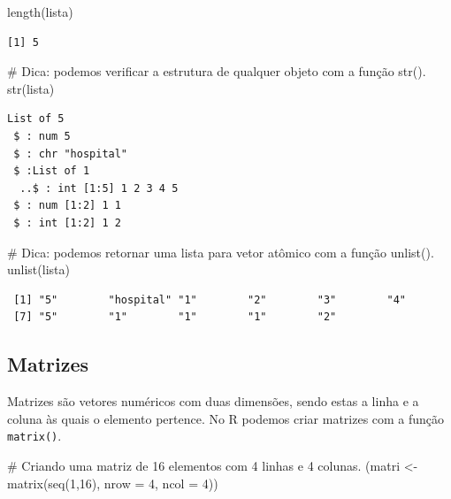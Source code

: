 \documentclass[
  letterpaper,
  DIV=11,
  numbers=noendperiod]{scrreprt}
\newenvironment{Shaded}{\begin{snugshade}}{\end{snugshade}}
\newcommand{\AttributeTok}[1]{\textcolor[rgb]{0.40,0.45,0.13}{#1}}
\newcommand{\CommentTok}[1]{\textcolor[rgb]{0.37,0.37,0.37}{#1}}
\newcommand{\DecValTok}[1]{\textcolor[rgb]{0.68,0.00,0.00}{#1}}
\newcommand{\FunctionTok}[1]{\textcolor[rgb]{0.28,0.35,0.67}{#1}}
\newcommand{\NormalTok}[1]{\textcolor[rgb]{0.00,0.23,0.31}{#1}}
\newcommand{\OtherTok}[1]{\textcolor[rgb]{0.00,0.23,0.31}{#1}}
\begin{document}
\begin{Shaded}
\begin{Highlighting}[]
\FunctionTok{length}\NormalTok{(lista)}
\end{Highlighting}
\end{Shaded}

\begin{verbatim}
[1] 5
\end{verbatim}

\begin{Shaded}
\begin{Highlighting}[]
\CommentTok{\# Dica: podemos verificar a estrutura de qualquer objeto com a função str().}
\FunctionTok{str}\NormalTok{(lista)}
\end{Highlighting}
\end{Shaded}

\begin{verbatim}
List of 5
 $ : num 5
 $ : chr "hospital"
 $ :List of 1
  ..$ : int [1:5] 1 2 3 4 5
 $ : num [1:2] 1 1
 $ : int [1:2] 1 2
\end{verbatim}

\begin{Shaded}
\begin{Highlighting}[]
\CommentTok{\# Dica: podemos retornar uma lista para vetor atômico com a função unlist().}
\FunctionTok{unlist}\NormalTok{(lista)}
\end{Highlighting}
\end{Shaded}

\begin{verbatim}
 [1] "5"        "hospital" "1"        "2"        "3"        "4"       
 [7] "5"        "1"        "1"        "1"        "2"       
\end{verbatim}

\hypertarget{matrizes}{%
\subsection{Matrizes}\label{matrizes}}

Matrizes são vetores numéricos com duas dimensões, sendo estas a linha e
a coluna às quais o elemento pertence. No R podemos criar matrizes com a
função \texttt{matrix()}.

\begin{Shaded}
\begin{Highlighting}[]
\CommentTok{\# Criando uma matriz de 16 elementos com 4 linhas e 4 colunas.}
\NormalTok{(matri }\OtherTok{\textless{}{-}} \FunctionTok{matrix}\NormalTok{(}\FunctionTok{seq}\NormalTok{(}\DecValTok{1}\NormalTok{,}\DecValTok{16}\NormalTok{), }\AttributeTok{nrow =} \DecValTok{4}\NormalTok{, }\AttributeTok{ncol =} \DecValTok{4}\NormalTok{))}
\end{Highlighting}
\end{Shaded}
\end{document}
